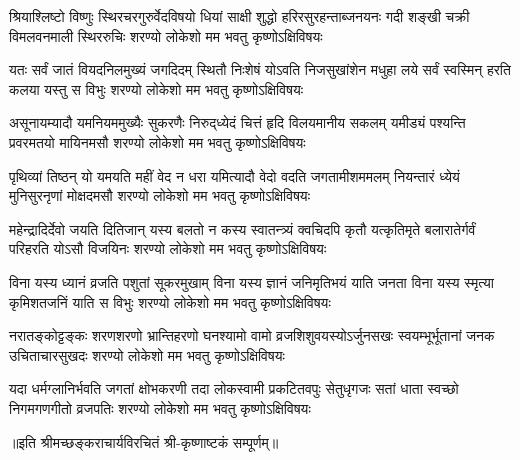 
\fourlineindentedshloka
{श्रियाश्लिष्टो विष्णुः स्थिरचरगुरुर्वेदविषयो}
{धियां साक्षी शुद्धो हरिरसुरहन्ताब्जनयनः}
{गदी शङ्खी चक्री विमलवनमाली स्थिररुचिः}
{शरण्यो लोकेशो मम भवतु कृष्णोऽक्षिविषयः}

\fourlineindentedshloka
{यतः सर्वं जातं वियदनिलमुख्यं जगदिदम्}
{स्थितौ निःशेषं योऽवति निजसुखांशेन मधुहा}
{लये सर्वं स्वस्मिन् हरति कलया यस्तु स विभुः}
{शरण्यो लोकेशो मम भवतु कृष्णोऽक्षिविषयः}

\fourlineindentedshloka
{असूनायम्यादौ यमनियममुख्यैः सुकरणैः}
{निरुद्‌ध्येदं चित्तं हृदि विलयमानीय सकलम्}
{यमीड्यं पश्यन्ति प्रवरमतयो मायिनमसौ}
{शरण्यो लोकेशो मम भवतु कृष्णोऽक्षिविषयः}

\fourlineindentedshloka
{पृथिव्यां तिष्ठन् यो यमयति महीं वेद न धरा}
{यमित्यादौ वेदो वदति जगतामीशममलम्}
{नियन्तारं ध्येयं मुनिसुरनृणां मोक्षदमसौ}
{शरण्यो लोकेशो मम भवतु कृष्णोऽक्षिविषयः}

\fourlineindentedshloka
{महेन्द्रादिर्देवो जयति दितिजान् यस्य बलतो}
{न कस्य स्वातन्त्र्यं क्वचिदपि कृतौ यत्कृतिमृते}
{बलारातेर्गर्वं परिहरति योऽसौ विजयिनः}
{शरण्यो लोकेशो मम भवतु कृष्णोऽक्षिविषयः}

\fourlineindentedshloka
{विना यस्य ध्यानं व्रजति पशुतां सूकरमुखाम्}
{विना यस्य ज्ञानं जनिमृतिभयं याति जनता}
{विना यस्य स्मृत्या कृमिशतजनिं याति स विभुः}
{शरण्यो लोकेशो मम भवतु कृष्णोऽक्षिविषयः}

\fourlineindentedshloka
{नरातङ्कोट्टङ्कः शरणशरणो भ्रान्तिहरणो}
{घनश्यामो वामो व्रजशिशुवयस्योऽर्जुनसखः}
{स्वयम्भूर्भूतानां जनक उचिताचारसुखदः}
{शरण्यो लोकेशो मम भवतु कृष्णोऽक्षिविषयः}

\fourlineindentedshloka
{यदा धर्मग्लानिर्भवति जगतां क्षोभकरणी}
{तदा लोकस्वामी प्रकटितवपुः सेतुधृगजः}
{सतां धाता स्वच्छो निगमगणगीतो व्रजपतिः}
{शरण्यो लोकेशो मम भवतु कृष्णोऽक्षिविषयः}

॥इति श्रीमच्छङ्कराचार्यविरचितं श्री-कृष्णाष्टकं सम्पूर्णम्॥
